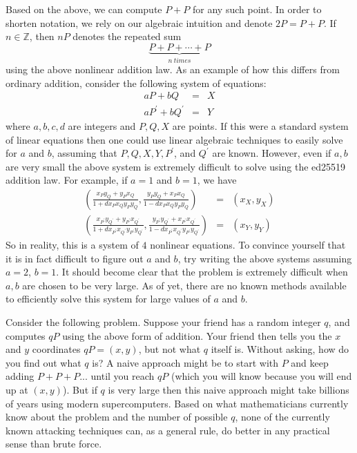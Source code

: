 \documentclass[12pt,english]{mrl}
\numberwithin{equation}{section}
\numberwithin{figure}{section}
\begin{document}
Based on the above, we can compute $P+P$ for any
such point. In order to shorten notation, we rely on our algebraic intuition and denote $2P = P + P$.
If $n\in\mathbb{Z}$, then $nP$ denotes the repeated sum $$\underbrace{P+P+\cdots+P}_{n\ times}$$
using the above nonlinear addition law. As an example of how this
differs from ordinary addition, consider the following system of equations:
\begin{eqnarray*}
aP+bQ&=&X \\
aP^{\prime}+bQ^{\prime}&=&Y
\end{eqnarray*}
 where $a,b,c,d$ are integers and $P,Q,X$ are points. If this were a standard
 system of linear equations then one could use linear algebraic techniques
to easily solve for $a$ and $b$, assuming that $P,Q,X,Y,P^{\prime}$,
and $Q^{\prime}$ are known. However, even if $a,b$ are very small
the above system is extremely difficult to solve using the ed25519
addition law. For example, if $a=1$ and $b=1$, we have 
\begin{eqnarray*}
\left(\frac{x_{P}y_{Q}+y_{P}x_{Q}}{1+dx_{P}x_{Q}y_{P}y_{Q}},\frac{y_{P}y_{Q}+x_{P}x_{Q}}{1-dx_{P}x_{Q}y_{P}y_{Q}}\right)&=&\left(x_{X},y_{X}\right) \\
\left(\frac{x_{P^{\prime}}y_{Q^{\prime}}+y_{P^{\prime}}x_{Q^{\prime}}}{1+dx_{P^{\prime}}x_{Q^{\prime}}y_{P^{\prime}}y_{Q^{\prime}}},\frac{y_{P^{\prime}}y_{Q^{\prime}}+x_{P^{\prime}}x_{Q^{\prime}}}{1-dx_{P^{\prime}}x_{Q^{\prime}}y_{P^{\prime}}y_{Q^{\prime}}}\right)&=&\left(x_{Y},y_{Y}\right)
\end{eqnarray*}
 So in reality, this is a system of $4$ nonlinear equations. To convince
yourself that it is in fact difficult to figure out $a$ and $b$,
try writing the above systems assuming $a=2$, $b=1$. It should become
clear that the problem is extremely difficult when $a,b$ are chosen
to be very large. As of yet, there are no known methods available to
efficiently solve this system for large values of $a$ and $b$.

Consider the following problem. Suppose your friend has a random integer
$q$, and computes $qP$ using the above form of addition. Your friend
then tells you the $x$ and $y$ coordinates $qP=\left(x,y\right)$,
but not what $q$ itself is. Without asking, how do you find out what
$q$ is? $ $A naive approach might be to start with $P$ and keep
adding $P+P+P...$ until you reach $qP$ (which you will know because
you will end up at $\left(x,y\right)$). But if $q$ is very large
then this naive approach might take billions of years using modern
supercomputers. Based on what mathematicians currently know about
the problem and the number of possible $q$, none of the currently
known attacking techniques can, as a general rule, do better in any
practical sense than brute force.
\end{document}
